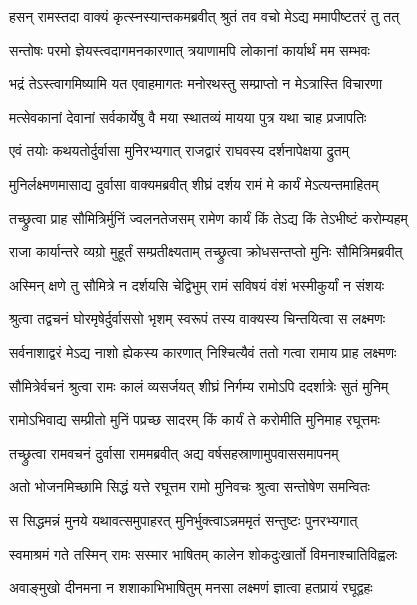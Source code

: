 \twolineshloka
{हसन् रामस्तदा वाक्यं कृत्स्नस्यान्तकमब्रवीत्}
{श्रुतं तव वचो मेऽद्य ममापीष्टतरं तु तत्} %

\twolineshloka
{सन्तोषः परमो ज्ञेयस्त्वदागमनकारणात्}
{त्रयाणामपि लोकानां कार्यार्थं मम सम्भवः} %

\twolineshloka
{भद्रं तेऽस्त्वागमिष्यामि यत एवाहमागतः}
{मनोरथस्तु सम्प्राप्तो न मेऽत्रास्ति विचारणा} %

\twolineshloka
{मत्सेवकानां देवानां सर्वकार्येषु वै मया}
{स्थातव्यं मायया पुत्र यथा चाह प्रजापतिः} %

\twolineshloka
{एवं तयोः कथयतोर्दुर्वासा मुनिरभ्यगात्}
{राजद्वारं राघवस्य दर्शनापेक्षया द्रुतम्} %

\twolineshloka
{मुनिर्लक्ष्मणमासाद्य दुर्वासा वाक्यमब्रवीत्}
{शीघ्रं दर्शय रामं मे कार्यं मेऽत्यन्तमाहितम्} %

\twolineshloka
{तच्छ्रुत्वा प्राह सौमित्रिर्मुनिं ज्वलनतेजसम्}
{रामेण कार्यं किं तेऽद्य किं तेऽभीष्टं करोम्यहम्} %

\twolineshloka
{राजा कार्यान्तरे व्यग्रो मुहूर्तं सम्प्रतीक्ष्यताम्}
{तच्छ्रुत्वा क्रोधसन्तप्तो मुनिः सौमित्रिमब्रवीत्} %

\twolineshloka
{अस्मिन् क्षणे तु सौमित्रे न दर्शयसि चेद्विभुम्}
{रामं सविषयं वंशं भस्मीकुर्यां न संशयः} %

\twolineshloka
{श्रुत्वा तद्वचनं घोरमृषेर्दुर्वाससो भृशम्}
{स्वरूपं तस्य वाक्यस्य चिन्तयित्वा स लक्ष्मणः} %

\twolineshloka
{सर्वनाशाद्वरं मेऽद्य नाशो ह्येकस्य कारणात्}
{निश्चित्यैवं ततो गत्वा रामाय प्राह लक्ष्मणः} %

\twolineshloka
{सौमित्रेर्वचनं श्रुत्वा रामः कालं व्यसर्जयत्}
{शीघ्रं निर्गम्य रामोऽपि ददर्शात्रेः सुतं मुनिम्} %

\twolineshloka
{रामोऽभिवाद्य सम्प्रीतो मुनिं पप्रच्छ सादरम्}
{किं कार्यं ते करोमीति मुनिमाह रघूत्तमः} %

\twolineshloka
{तच्छ्रुत्वा रामवचनं दुर्वासा राममब्रवीत्}
{अद्य वर्षसहस्राणामुपवाससमापनम्} %

\twolineshloka
{अतो भोजनमिच्छामि सिद्धं यत्ते रघूत्तम}
{रामो मुनिवचः श्रुत्वा सन्तोषेण समन्वितः} %

\twolineshloka
{स सिद्धमन्नं मुनये यथावत्समुपाहरत्}
{मुनिर्भुक्त्वाऽन्नममृतं सन्तुष्टः पुनरभ्यगात्} %

\twolineshloka
{स्वमाश्रमं गते तस्मिन् रामः सस्मार भाषितम्}
{कालेन शोकदुःखार्तो विमनाश्चातिविह्वलः} %

\twolineshloka
{अवाङ्मुखो दीनमना न शशाकाभिभाषितुम्}
{मनसा लक्ष्मणं ज्ञात्वा हतप्रायं रघूद्वहः} %

